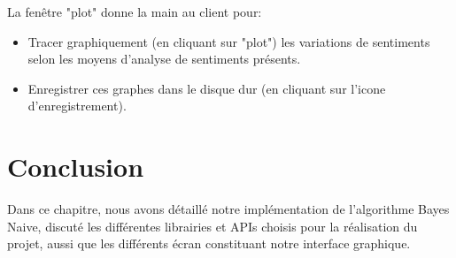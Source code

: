 La fenêtre "plot" donne la main au client pour:
\begin{itemize}
    \item Tracer graphiquement (en cliquant sur "plot") les variations de sentiments selon les moyens d'analyse de sentiments présents.
    \item Enregistrer ces graphes dans le disque dur (en cliquant sur l'icone d'enregistrement).
\end{itemize}
\section{Conclusion}
Dans ce chapitre, nous avons détaillé notre implémentation de l'algorithme Bayes Naive, discuté les différentes librairies et APIs choisis pour la réalisation du projet, aussi que les différents écran constituant notre interface graphique.
